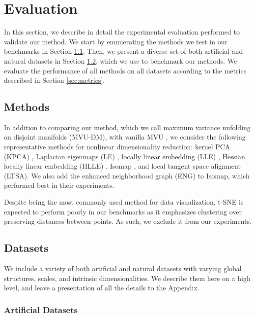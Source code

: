 \documentclass{article} %
\begin{document}
\section{Evaluation} \label{sec:evaluation}

In this section, we describe in detail the experimental evaluation performed to validate our method. We start by enumerating the methods we test in our benchmarks in Section \ref{sec:methods}. Then, we present a diverse set of both artificial and natural datasets in Section \ref{sec:datasets}, which we use to benchmark our methods. We evaluate the performance of all methods on all datasets according to the metrics described in Section \ref{sec:metrics}.

\subsection{Methods} \label{sec:methods}

In addition to comparing our method, which we call maximum variance unfolding on disjoint manifolds (MVU-DM), with vanilla MVU \citep{mvu}, we consider the following representative methods for nonlinear dimensionality reduction: kernel PCA (KPCA) \citep{kpca}, Laplacian eigenmaps (LE) \citep{le}, locally linear embedding (LLE) \citep{lle}, Hessian locally linear embedding (HLLE) \citep{hlle}, Isomap \citep{isomap}, and local tangent space alignment \citep{ltsa} (LTSA). We also add the enhanced neighborhood graph (ENG) \citep{eng} to Isomap, which performed best in their experiments.

Despite being the most commonly used method for data visualization, t-SNE \citep{tsne} is expected to perform poorly in our benchmarks as it emphasizes clustering over preserving distances between points. As such, we exclude it from our experiments.

\subsection{Datasets} \label{sec:datasets}

We include a variety of both artificial and natural datasets with varying global structures, scales, and intrinsic dimensionalities. We describe them here on a high level, and leave a presentation of all the details to the Appendix.

\subsubsection{Artificial Datasets} \label{sec:datasets-artificial}
\end{document}
